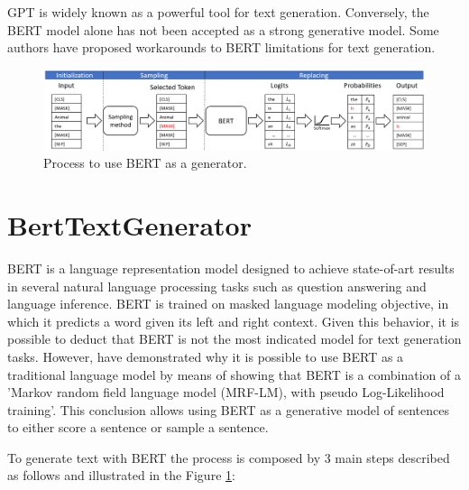 \documentclass[10pt,twocolumn,letterpaper]{article}
\begin{document}
GPT is widely known as a powerful tool for text generation.
Conversely, the BERT model alone has not been accepted as a strong generative model.
Some authors \cite{wang2019bert} have proposed workarounds to BERT limitations for text generation.

\begin{figure}[t]
   \centering
   \includegraphics[scale=0.6]{BERTfunc.PNG}
   \caption{Process to use BERT as a generator.}
   \label{fig:BertFig}
\end{figure}

\section{BertTextGenerator}
BERT is a language representation model designed to achieve state-of-art results
in several natural language processing tasks such as question answering and language inference.
BERT is trained on masked language modeling objective, in which it predicts a word given its
left and right context.
Given this behavior, it is possible to deduct that BERT is not the most
indicated model for text generation tasks.
However, \cite{wang2019bert} have demonstrated why it is possible to use BERT as a traditional
language model by means of showing that BERT is a combination of a 'Markov random field
language model (MRF-LM), with pseudo Log-Likelihood training'.
This conclusion allows using BERT as a generative model of sentences to either score a sentence or
sample a sentence.

To generate text with BERT the process is composed by 3 main steps described as follows and illustrated in the Figure \ref{fig:BertFig}:
\end{document}
